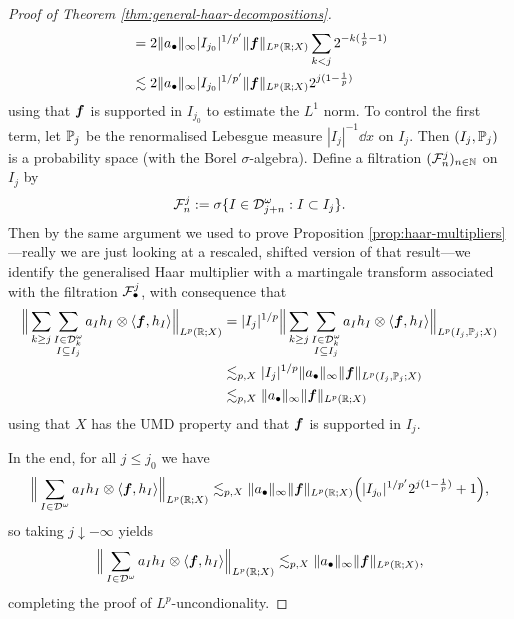 \begin{proof}[Proof of Theorem \ref{thm:general-haar-decompositions}]
\begin{equation*}
\begin{aligned}
      &= 2\|a_{\bullet}\|_{\infty} |I_{j_{0}}|^{1/p'} \|\mb{f}\|_{L^p(\R;X)} \sum_{k < j} 2^{-k(\frac{1}{p} - 1)} \\
      &\lesssim 2\|a_{\bullet}\|_{\infty} |I_{j_{0}}|^{1/p'} \|\mb{f}\|_{L^p(\R;X)} 2^{j(1 - \frac{1}{p})}
    \end{aligned}
  \end{equation*}
  using that $\mb{f}$ is supported in $I_{j_{0}}$ to estimate the $L^1$ norm.
  To control the first term, let $\P_{j}$ be the renormalised Lebesgue measure $|I_{j}|^{-1} \dd x$ on $I_{j}$.
  Then $(I_{j},\P_{j})$ is a probability space (with the Borel $\sigma$-algebra).
  Define a filtration $(\mc{F}_{n}^{j})_{n \in \N}$ on $I_{j}$ by
  \begin{equation*}
    \mc{F}_{n}^{j} := \sigma\{I \in \mc{D}^{\omega}_{j+n} : I \subset I_{j}\}.
  \end{equation*}
  Then by the same argument we used to prove Proposition \ref{prop:haar-multipliers}---really we are just looking at a rescaled, shifted version of that result---we identify the generalised Haar multiplier with a martingale transform associated with the filtration $\mc{F}^{j}_{\bullet}$, with consequence that
  \begin{equation*}
    \begin{aligned}
      \Big\| \sum_{k \geq j} \sum_{\substack{I \in \mc{D}_{k}^{\omega} \\ I \subseteq I_{j}}} a_{I} h_{I} \otimes \langle \mb{f}, h_{I} \rangle \Big\|_{L^p(\R;X)}
      &=  |I_{j}|^{1/p} \Big\| \sum_{k \geq j} \sum_{\substack{I \in \mc{D}_{k}^{\omega} \\ I \subseteq I_{j}}} a_{I} h_{I} \otimes \langle \mb{f}, h_{I} \rangle \Big\|_{L^p(I_{j}, \P_{j};X)} \\
      &\lesssim_{p,X} |I_{j}|^{1/p} \|a_{\bullet}\|_{\infty} \|\mb{f}\|_{L^p(I_{j},\P_{j};X)} \\
      &\lesssim_{p,X} \|a_{\bullet}\|_{\infty} \|\mb{f}\|_{L^p(\R;X)}
    \end{aligned}
  \end{equation*}
  using that $X$ has the UMD property and that $\mb{f}$ is supported in $I_{j}$.

  In the end, for all $j \leq j_{0}$ we have
  \begin{equation*}
    \Big\| \sum_{I \in \mc{D}^{\omega}} a_{I} h_{I} \otimes \langle \mb{f}, h_{I} \rangle \Big\|_{L^p(\R;X)}
    \lesssim_{p,X} \|a_{\bullet}\|_{\infty} \|\mb{f}\|_{L^p(\R;X)} \Big(|I_{j_{0}}|^{1/p'}  2^{j(1 - \frac{1}{p})} + 1\Big),
  \end{equation*}
  so taking $j \downarrow -\infty$ yields
    \begin{equation*}
    \Big\| \sum_{I \in \mc{D}^{\omega}} a_{I} h_{I} \otimes \langle \mb{f}, h_{I} \rangle \Big\|_{L^p(\R;X)}
    \lesssim_{p,X} \|a_{\bullet}\|_{\infty}\|\mb{f}\|_{L^p(\R;X)},
  \end{equation*}
  completing the proof of $L^p$-uncondionality.


\end{proof}
